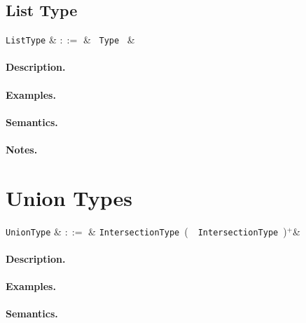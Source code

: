 \subsection{List Type}

\begin{syntax}
  \verb+ListType+ & $::=$ & \token{[} \ \verb+Type+ \ \token{]}&\\
\end{syntax}

\paragraph{Description.}

\paragraph{Examples.}

\paragraph{Semantics.}

\paragraph{Notes.} 


\section{Union Types}

\begin{syntax}
  \verb+UnionType+ & $::=$ & \verb+IntersectionType+\ \big(\ \token{|}\ \verb+IntersectionType+\
  \big)$^+$&\\
\end{syntax}

\paragraph{Description.}

\paragraph{Examples.}

\paragraph{Semantics.}

